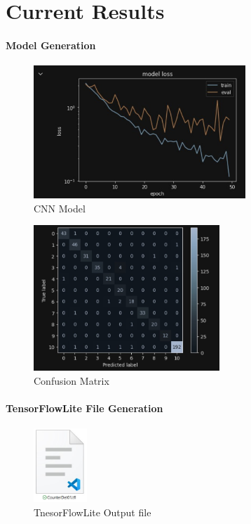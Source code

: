 \section{Current Results}

\STANDARD{\insertsection}
{ 
	\framesubtitle{\insertsubsection}
	\framesubtitle{Model Generation}
		\begin{figure}  [!h]
			\begin{center}
				\includegraphics[width=8cm]{images/TrainedModel}
				\caption{CNN Model}
			\end{center}
		\end{figure}
	
		\begin{figure}  [!h]
		\begin{center}
			\includegraphics[width=7cm]{images/ConfusionMatrix}
			\caption{Confusion Matrix}
		\end{center}
	\end{figure}
}


\STANDARD{\insertsection}
{ 
	\framesubtitle{\insertsubsection}
	\framesubtitle{TensorFlowLite File Generation}
			\begin{figure}  [!h]
		\begin{center}
			\includegraphics[width=2cm]{images/tfl.jpg}
			\caption{TnesorFlowLite Output file}
		\end{center}
	\end{figure}
}

